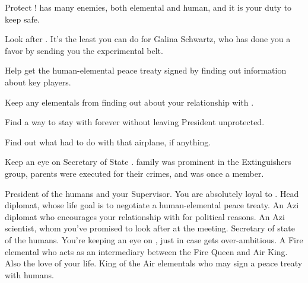 \documentclass[char]{elementals}
\begin{document}
\begin{itemz}[Goals]
  \item Protect \cLeader{\full}!  \cLeader{\They} has many enemies, both elemental and human, and it is your duty to keep \cLeader{\them} safe.
  \item Look after \cScientist{\full}.  It's the least you can do for Galina Schwartz, who has done you a favor by sending you the experimental belt.
  \item Help \cLeader{} get the human-elemental peace treaty signed by finding out information about key players.
  \item Keep any elementals from finding out about your relationship with \cJuliet{}.
  \item Find a way to stay with \cJuliet{} forever without leaving President \cLeader{} unprotected.
  \item Find out what \cJuliet{} had to do with that airplane, if anything.
  \item Keep an eye on Secretary of State \cDema{\full}.  \cDema{\Their} family was prominent in the Extinguishers group, \cDema{\their} parents were executed for their crimes, and 
  \cDema{\they} \cDema{\themself} was once a member.
\end{itemz}

\begin{contacts}
  \contact{\cLeader{\full}} President of the humans and your Supervisor.  You are absolutely loyal to \cLeader{\them}.
  \contact{\cAvatar{\full}} Head diplomat, whose life goal is to negotiate a human-elemental peace treaty.
  \contact{\cDiplomat{\full}} An Azi diplomat who encourages your relationship with \cJuliet{} for political reasons.
  \contact{\cScientist{\full}} An Azi scientist, whom you've promised to look after at the meeting.
  \contact{\cDema{\full}} Secretary of state of the humans.  You're keeping an eye on \cDema{\them}, just in case \cDema{\they} gets over-ambitious.
  \contact{\cJuliet{\full}} A Fire elemental who acts as an intermediary between the Fire Queen and Air King.  Also the love of your life.
  \contact{\cKing{}} King of the Air elementals who may sign a peace treaty with humans.
\end{contacts}
\end{document}
